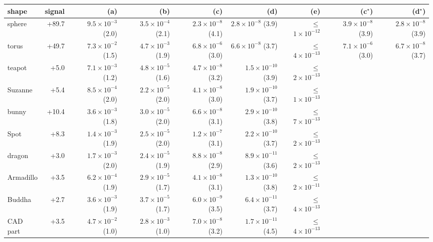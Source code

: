 \begin{tabular}{lrrrrrrrr}
\toprule
shape & signal & (a) & (b) & (c) & (d) & (e) & (c$^\star$) & (d$^\star$) \\
\midrule
sphere & +89.7 & $9.5\times10^{-3}$ (2.0) & $3.5\times10^{-4}$ (2.1) & $2.3\times10^{-8}$ (4.1) & $2.8\times10^{-8}$ (3.9) & $\leq$$1\times10^{-12}$ & $3.9\times10^{-8}$ (3.9) & $2.8\times10^{-8}$ (3.9) \\
torus & +49.7 & $7.3\times10^{-2}$ (1.5) & $4.7\times10^{-3}$ (1.9) & $6.8\times10^{-6}$ (3.0) & $6.6\times10^{-8}$ (3.7) & $\leq$$4\times10^{-13}$ & $7.1\times10^{-6}$ (3.0) & $6.7\times10^{-8}$ (3.7) \\
\midrule
teapot & +5.0 & $7.1\times10^{-3}$ (1.2) & $4.8\times10^{-5}$ (1.6) & $4.7\times10^{-8}$ (3.2) & $1.5\times10^{-10}$ (3.9) & $\leq$$2\times10^{-13}$ &  &  \\
Suzanne & +5.4 & $8.5\times10^{-4}$ (2.0) & $2.2\times10^{-5}$ (2.0) & $4.1\times10^{-8}$ (3.0) & $1.9\times10^{-10}$ (3.7) & $\leq$$1\times10^{-13}$ &  &  \\
bunny & +10.4 & $3.6\times10^{-3}$ (1.8) & $3.0\times10^{-5}$ (2.0) & $6.6\times10^{-8}$ (3.1) & $2.9\times10^{-10}$ (3.8) & $\leq$$7\times10^{-13}$ &  &  \\
Spot & +8.3 & $1.4\times10^{-3}$ (1.9) & $2.5\times10^{-5}$ (2.0) & $1.2\times10^{-7}$ (3.1) & $2.2\times10^{-10}$ (3.7) & $\leq$$2\times10^{-13}$ &  &  \\
dragon & +3.0 & $1.7\times10^{-3}$ (2.0) & $2.4\times10^{-5}$ (1.9) & $8.8\times10^{-8}$ (2.9) & $8.9\times10^{-11}$ (3.6) & $\leq$$2\times10^{-13}$ &  &  \\
Armadillo & +3.5 & $6.2\times10^{-4}$ (1.9) & $2.9\times10^{-5}$ (1.7) & $4.1\times10^{-8}$ (3.1) & $1.3\times10^{-10}$ (3.8) & $\leq$$2\times10^{-11}$ &  &  \\
Buddha & +2.7 & $3.6\times10^{-3}$ (1.9) & $3.7\times10^{-5}$ (1.7) & $6.0\times10^{-9}$ (3.5) & $6.4\times10^{-11}$ (3.7) & $\leq$$4\times10^{-13}$ &  &  \\
CAD part & +3.5 & $4.7\times10^{-2}$ (1.0) & $2.8\times10^{-3}$ (1.0) & $7.0\times10^{-8}$ (3.2) & $1.7\times10^{-11}$ (4.5) & $\leq$$4\times10^{-13}$ &  &  \\
\bottomrule
\end{tabular}
